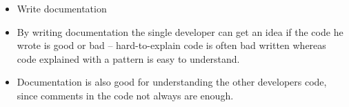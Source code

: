 \documentclass[Main]{subfiles}
\begin{document}
\begin{itemize}
	\item Write documentation
	\item[] By writing documentation the single developer can get an idea if the code he wrote is good or bad -- hard-to-explain code is often bad written whereas code explained with a pattern is easy to understand.
	\item[] Documentation is also good for understanding the other developers code, since comments in the code not always are enough.
	
\end{itemize}
\end{document}
